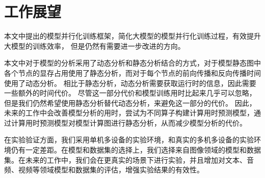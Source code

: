 \section{工作展望}

本文中提出的模型并行化训练框架\sys{}，简化大模型的模型并行化训练过程，有效提升大模型的训练效率，
但是仍然有需要进一步改进的方向。

本文中对于模型的分析采用了动态分析和静态分析结合的方式，对于模型静态图中各个节点的显存占用使用了静态分析，而对于每个节点的前向传播和反向传播时间使用了动态分析。
相比于静态分析，动态分析需要获取运行时的信息，因此需要一些额外的时间代价。
尽管这一部分代价和模型训练用时比起来几乎可以忽略，但是我们仍然希望使用静态分析替代动态分析，来避免这一部分的代价。
因此，未来的工作中会改善模型分析的用时，尝试为不同算子构建计算用时预测模型，通过计算用时预测模型对模型计算图进行静态分析，从而减少模型分析的代价。

在实验验证方面，我们采用单机多设备的实验环境，和真实的多机多设备的实验环境仍有一定差距。在模型和数据集的选择上，我们选择来自图像领域的模型和数据集。在未来的工作中，我们会在更真实的场景下进行实验，并且增加对文本、音频、视频等领域模型和数据集的评估，增强实验结果的有效性。